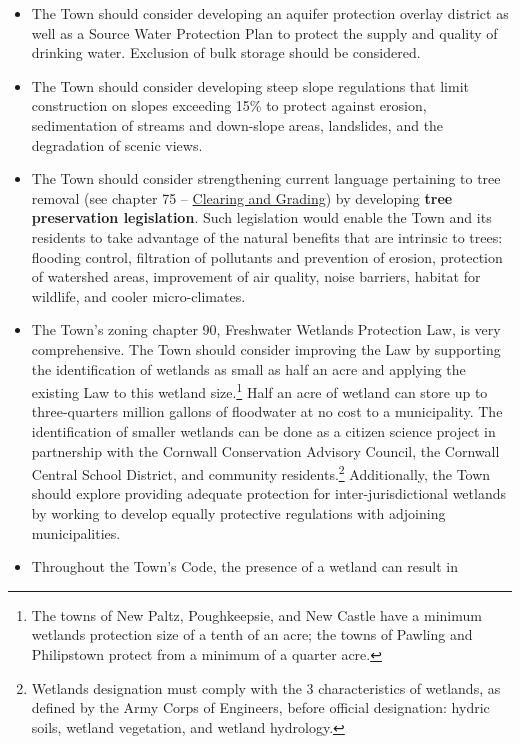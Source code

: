 \begin{itemize}
    \item The Town should consider developing an aquifer protection overlay 
    district as well as a Source Water Protection Plan to protect the supply 
    and quality of drinking water.  Exclusion of bulk storage should be 
    considered.
    \item The Town should consider developing steep slope regulations that limit 
    construction on slopes exceeding 15\% to protect against erosion, 
    sedimentation of streams and down-slope areas, landslides, and the 
    degradation of scenic views.
    \item The Town should consider strengthening current language pertaining to
    tree removal (see chapter 75 –
    \href{https://ecode360.com/10555070?highlight=trees#10555070}{Clearing
    and Grading}) by developing \textbf{tree preservation legislation}. Such
    legislation would enable the Town and its residents to take advantage of
    the natural benefits that are intrinsic to trees: flooding control,
    filtration of pollutants and prevention of erosion, protection of watershed
    areas, improvement of air quality, noise barriers, habitat for wildlife,
    and cooler micro-climates.
    \item The Town’s zoning chapter 90, Freshwater Wetlands Protection Law, is 
    very comprehensive. The Town should consider improving the Law by supporting 
    the identification of wetlands as small as half an acre and applying the 
    existing Law to this wetland size.\footnote{The towns of New Paltz, Poughkeepsie, and New Castle have a minimum wetlands protection size of a tenth of an acre; the towns of Pawling and Philipstown protect from a minimum of a quarter acre.} Half an acre of wetland can store up 
    to three-quarters million gallons of floodwater at no cost to a 
    municipality. The identification of smaller wetlands can be done as a 
    citizen science project in partnership with the Cornwall Conservation 
    Advisory Council, the Cornwall Central School District, and community
    residents.\footnote{Wetlands designation must comply with the 3
    characteristics of wetlands, as defined by the Army Corps of Engineers,
    before official designation:  hydric soils, wetland vegetation, and
    wetland hydrology.} Additionally, the Town should explore providing
    adequate protection for inter-jurisdictional wetlands by working to develop
    equally protective regulations with adjoining municipalities.
    \item Throughout the Town’s Code, the presence of a wetland can result in 

\end{itemize}
